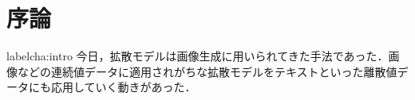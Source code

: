 \chapter{序論}
label{cha:intro}
今日，拡散モデルは画像生成に用いられてきた手法であった．画像などの連続値データに適用されがちな拡散モデルをテキストといった離散値データにも応用していく動きがあった．
\quad
